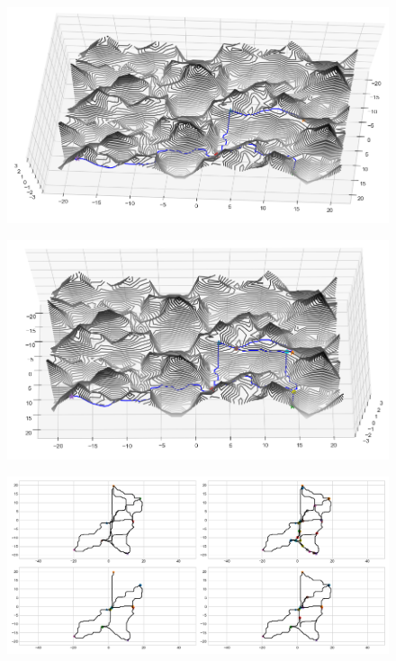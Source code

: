 \documentclass{beamer}[11pt]
\begin{document}
		\begin{frame}
			\begin{figure}[t]
				\includegraphics[width=1\textwidth]{Pics/g12.png}
			\end{figure}
		\end{frame}

		\begin{frame}
			\begin{figure}[t]
				\includegraphics[width=1\textwidth]{Pics/g13.png}
			\end{figure}
		\end{frame}

		\begin{frame}
			\begin{figure}[t]
				\includegraphics[width=1\textwidth]{Pics/g31.png}
			\end{figure}
		\end{frame}
\end{document}
